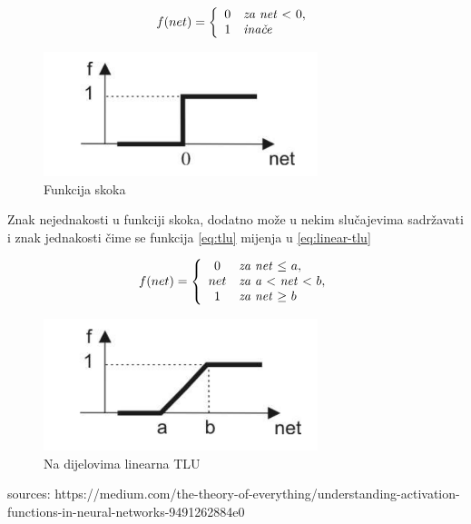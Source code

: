 \begin{equation}
f(net)=\left\{
\begin{array}{c l}	
     0 & $\textit{za net} $ < $ $ 0,\\
     1 & $\textit{inače}$
\end{array}\right.
\label{eq:Funkcija skoka}
\end{equation}

\begin{figure}[H]
\centering
\includegraphics[width=8cm]{img/TLU.png}
\caption{Funkcija skoka}
\label{img:tlu}
\end{figure}

Znak nejednakosti u funkciji skoka, dodatno može u nekim slučajevima sadržavati i znak jednakosti čime se funkcija \ref{eq:tlu} mijenja u \ref{eq:linear-tlu}

\begin{equation}
f(net)=\left\{
\begin{array}{c l}	
     0   & $\textit{za net} $ \leq $ $ a,\\
     net & $\textit{za a} $ < $ \textit{net} $ < $ $ b,\\
     1   & $\textit{za net} $ \geq $ $ b
\end{array}\right.
\label{eq:Funkcija skoka koja je na dijelovima linearna}
\end{equation}

\begin{figure}[H]
\centering
\includegraphics[width=8cm]{img/LinearTLU.png}
\caption{Na dijelovima linearna TLU}
\label{img:linear-tlu}
\end{figure}




sources: https://medium.com/the-theory-of-everything/understanding-activation-functions-in-neural-networks-9491262884e0